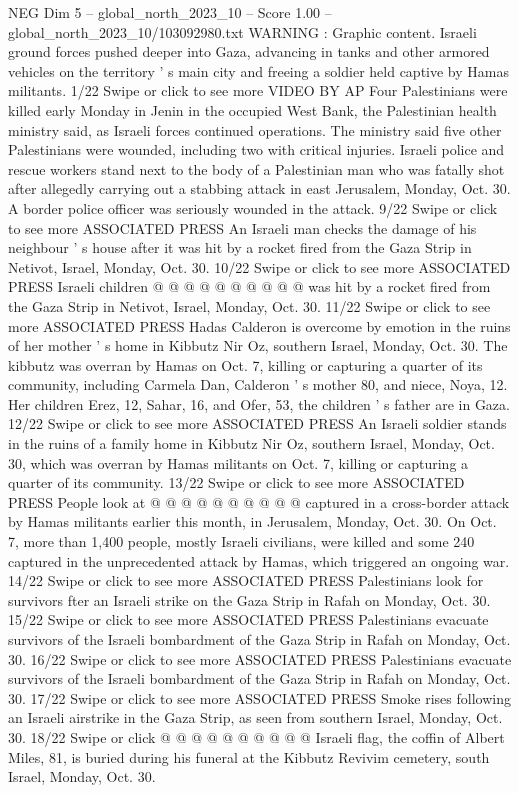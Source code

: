 \begin{textsample}{NEG Dim 5 – global\_north\_2023\_10 – Score 1.00 – global\_north\_2023\_10/103092980.txt}  \label{ex:f5_neg_030}
WARNING : Graphic content.
Israeli ground forces pushed deeper into Gaza, advancing in tanks and other armored vehicles on the territory ' s main city and freeing a soldier held captive by Hamas militants. 1/22 Swipe or click to see more VIDEO BY AP Four Palestinians were killed early Monday in Jenin in the occupied West Bank, the Palestinian health ministry said, as Israeli forces continued operations.
The ministry said five other Palestinians were wounded, including two with critical injuries.
Israeli police and rescue workers stand next to the body of a Palestinian man who was fatally shot after allegedly carrying out a stabbing attack in east Jerusalem, Monday, Oct. 30.
A border police officer was seriously wounded in the attack. 9/22 Swipe or click to see more ASSOCIATED PRESS An Israeli man checks the damage of his neighbour ' s house after it was hit by a rocket fired from the Gaza Strip in Netivot, Israel, Monday, Oct. 30. 10/22 Swipe or click to see more ASSOCIATED PRESS Israeli children @ @ @ @ @ @ @ @ @ @ was hit by a rocket fired from the Gaza Strip in Netivot, Israel, Monday, Oct. 30. 11/22 Swipe or click to see more ASSOCIATED PRESS Hadas Calderon is overcome by emotion in the ruins of her mother ' s home in Kibbutz Nir Oz, southern Israel, Monday, Oct. 30.
The kibbutz was overran by Hamas on Oct. 7, killing or capturing a quarter of its community, including Carmela Dan, Calderon ' s mother 80, and niece, Noya, 12.
Her children Erez, 12, Sahar, 16, and Ofer, 53, the children ' s father are in Gaza. 12/22 Swipe or click to see more ASSOCIATED PRESS An Israeli soldier stands in the ruins of a family home in Kibbutz Nir Oz, southern Israel, Monday, Oct. 30, which was overran by Hamas militants on Oct. 7, killing or capturing a quarter of its community. 13/22 Swipe or click to see more ASSOCIATED PRESS People look at @ @ @ @ @ @ @ @ @ @ captured in a cross-border attack by Hamas militants earlier this month, in Jerusalem, Monday, Oct. 30.
On Oct. 7, more than 1,400 people, mostly Israeli civilians, were killed and some 240 captured in the unprecedented attack by Hamas, which triggered an ongoing war. 14/22 Swipe or click to see more ASSOCIATED PRESS Palestinians look for survivors fter an Israeli strike on the Gaza Strip in Rafah on Monday, Oct. 30. 15/22 Swipe or click to see more ASSOCIATED PRESS Palestinians evacuate survivors of the Israeli bombardment of the Gaza Strip in Rafah on Monday, Oct. 30. 16/22 Swipe or click to see more ASSOCIATED PRESS Palestinians evacuate survivors of the Israeli bombardment of the Gaza Strip in Rafah on Monday, Oct. 30. 17/22 Swipe or click to see more ASSOCIATED PRESS Smoke rises following an Israeli airstrike in the Gaza Strip, as seen from southern Israel, Monday, Oct. 30. 18/22 Swipe or click @ @ @ @ @ @ @ @ @ @ Israeli flag, the coffin of Albert Miles, 81, is buried during his funeral at the Kibbutz Revivim cemetery, south Israel, Monday, Oct. 30.

\end{textsample}
